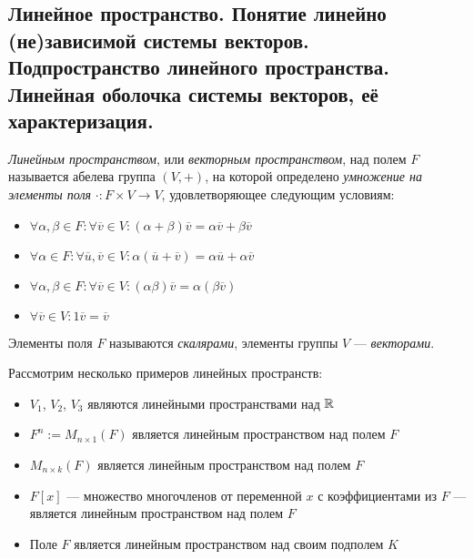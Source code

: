 \subsection{Линейное пространство. Понятие линейно (не)зависимой системы векторов. Подпространство линейного пространства. Линейная оболочка системы векторов, её характеризация.}

    \begin{definition}
    	\textit{Линейным пространством}, или \textit{векторным пространством}, над полем $F$ называется абелева группа $(V, +)$, на которой определено \textit{умножение на элементы поля} $\cdot: F \times V \rightarrow V$, удовлетворяющее следующим условиям:
    	\begin{itemize}
    		\item $\forall \alpha, \beta \in F: \forall \overline{v} \in V: (\alpha + \beta)\overline{v} = \alpha\overline{v} + \beta\overline{v}$
    		\item $\forall \alpha \in F: \forall \overline{u}, \overline{v} \in V: \alpha(\overline{u} + \overline{v}) = \alpha\overline{u} + \alpha\overline{v}$
    		\item $\forall \alpha, \beta \in F: \forall \overline{v} \in V: (\alpha\beta)\overline{v} = \alpha(\beta\overline{v})$
    		\item $\forall \overline{v} \in V: 1\overline{v} = \overline{v}$
    	\end{itemize}
    
    	Элементы поля $F$ называются \textit{скалярами}, элементы группы $V$ --- \textit{векторами}.
    \end{definition}
    
    \begin{example}
    	Рассмотрим несколько примеров линейных пространств:
    	\begin{itemize}
    		\item $V_1$, $V_2$, $V_3$ являются линейными пространствами над $\mathbb{R}$
    		\item $F^n := M_{n \times 1}(F)$ является линейным пространством над полем $F$
    		\item $M_{n \times k}(F)$ является линейным пространством над полем $F$
    		\item $F[x]$ --- множество многочленов от переменной $x$ с коэффициентами из $F$ --- является линейным пространством над полем $F$
    		\item Поле $F$ является линейным пространством над своим подполем $K$
    	\end{itemize}
    \end{example}
    
